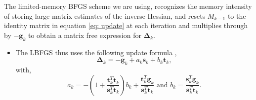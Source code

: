 \documentclass[useAMS,usenatbib]{mnras}
\begin{document}
The limited-memory BFGS scheme we are using, recognizes the memory intensity of storing large matrix estimates of the inverse Hessian, and resets $M_{k-1}$ to the identity matrix in equation \eqref{eq: update} at each iteration and multiplies through by $-\boldsymbol{g}_k$ to obtain a matrix free expression for $\boldsymbol{\Delta}_k$. 
\begin{itemize}
\item The LBFGS thus uses the following update formula \citep{Asirvadam2004},  
\begin{equation}
\boldsymbol{\Delta}_k = - \boldsymbol{g}_k + a_k \boldsymbol{s}_k + b_k \boldsymbol{t}_k,
\end{equation}
with, 
\begin{equation}
a_k = -\left(1 + \frac{\boldsymbol{t}^T_k \boldsymbol{t}_{k}}{\boldsymbol{s}^T_k\boldsymbol{t}_k}\right)b_k + \frac{\boldsymbol{t}^T_k \boldsymbol{g}_k}{\boldsymbol{s}^T_k\boldsymbol{t}_k} \text{ and } b_k = \frac{\boldsymbol{s}^T_k \boldsymbol{g}_k}{\boldsymbol{s}^T_k\boldsymbol{t}_k}.
\end{equation}
\end{itemize}














\end{document}
